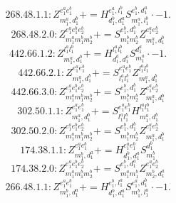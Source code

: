\documentclass[letterpaper,10pt,fleqn,leqno,onecolumn]{article}
\begin{document}
\begin{equation} \;\;\;\;\;\;  268.48.1.1: Z^{e_{1}^{a}e_{1}^{b}}_{m_{1}^{a},d_{1}^{b}}+=H^{e_{1}^{a},l_{1}^{b}}_{d_{1}^{b},d_{1}^{a}}S^{e_{1}^{b},d_{1}^{a}}_{m_{1}^{a},l_{1}^{b}}\cdot -1. \end{equation}
\begin{equation} \;\;\;\;\;\;  268.48.2.0: Z^{e_{1}^{a}e_{1}^{b}e_{2}^{b}}_{m_{1}^{a}m_{1}^{b}m_{2}^{b}}+=S^{e_{1}^{b},d_{1}^{b}}_{m_{1}^{b}m_{2}^{b}}Z^{e_{1}^{a}e_{2}^{b}}_{m_{1}^{a},d_{1}^{b}} \end{equation}
\begin{equation} \;\;\;\;\;\;  442.66.1.2: Z^{l_{1}^{a}l_{1}^{b}}_{m_{1}^{a},d_{1}^{b}}+=H^{l_{1}^{a}l_{1}^{b}}_{d_{1}^{b},d_{1}^{a}}S^{d_{1}^{a}}_{m_{1}^{a}}\cdot -1. \end{equation}
\begin{equation} \;\;\;\;\;\;  442.66.2.1: Z^{e_{1}^{a}e_{1}^{b}}_{m_{1}^{a},d_{1}^{b}}+=S^{e_{1}^{a}e_{1}^{b}}_{l_{1}^{a}l_{1}^{b}}Z^{l_{1}^{a}l_{1}^{b}}_{m_{1}^{a},d_{1}^{b}} \end{equation}
\begin{equation} \;\;\;\;\;\;  442.66.3.0: Z^{e_{1}^{a}e_{1}^{b}e_{2}^{b}}_{m_{1}^{a}m_{1}^{b}m_{2}^{b}}+=S^{e_{1}^{b},d_{1}^{b}}_{m_{1}^{b}m_{2}^{b}}Z^{e_{1}^{a}e_{2}^{b}}_{m_{1}^{a},d_{1}^{b}} \end{equation}
\begin{equation} \;\;\;\;\;\;  302.50.1.1: Z^{e_{1}^{a}e_{1}^{b}}_{m_{1}^{a},d_{1}^{b}}+=S^{e_{1}^{a}e_{1}^{b}}_{l_{1}^{a}l_{1}^{b}}H^{l_{1}^{a}l_{1}^{b}}_{m_{1}^{a},d_{1}^{b}} \end{equation}
\begin{equation} \;\;\;\;\;\;  302.50.2.0: Z^{e_{1}^{a}e_{1}^{b}e_{2}^{b}}_{m_{1}^{a}m_{1}^{b}m_{2}^{b}}+=S^{e_{1}^{b},d_{1}^{b}}_{m_{1}^{b}m_{2}^{b}}Z^{e_{1}^{a}e_{2}^{b}}_{m_{1}^{a},d_{1}^{b}} \end{equation}
\begin{equation} \;\;\;\;\;\;  174.38.1.1: Z^{e_{1}^{a}e_{1}^{b}}_{m_{1}^{b},d_{1}^{a}}+=H^{e_{1}^{a}e_{1}^{b}}_{d_{1}^{b},d_{1}^{a}}S^{d_{1}^{b}}_{m_{1}^{b}} \end{equation}
\begin{equation} \;\;\;\;\;\;  174.38.2.0: Z^{e_{1}^{a}e_{1}^{b}e_{2}^{b}}_{m_{1}^{a}m_{1}^{b}m_{2}^{b}}+=S^{e_{1}^{b},d_{1}^{a}}_{m_{1}^{a}m_{1}^{b}}Z^{e_{1}^{a}e_{2}^{b}}_{m_{2}^{b},d_{1}^{a}} \end{equation}
\begin{equation} \;\;\;\;\;\;  266.48.1.1: Z^{e_{1}^{a}e_{1}^{b}}_{m_{1}^{b},d_{1}^{a}}+=H^{e_{1}^{b},l_{1}^{a}}_{d_{1}^{b},d_{1}^{a}}S^{e_{1}^{a},d_{1}^{b}}_{m_{1}^{b},l_{1}^{a}}\cdot -1. \end{equation}
\end{document}
